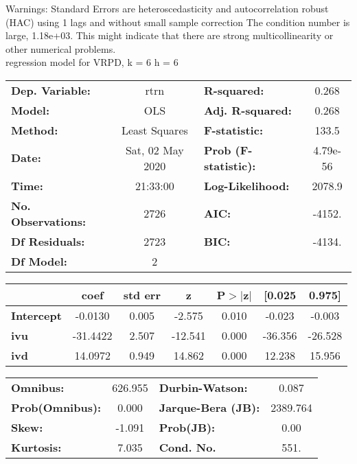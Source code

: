 Warnings: \newline
 [1] Standard Errors are heteroscedasticity and autocorrelation robust (HAC) using 1 lags and without small sample correction \newline
 [2] The condition number is large, 1.18e+03. This might indicate that there are \newline
 strong multicollinearity or other numerical problems.\\ 

regression model for VRPD, k = 6 h = 6\begin{center}
\begin{tabular}{lclc}
\toprule
\textbf{Dep. Variable:}    &       rtrn       & \textbf{  R-squared:         } &     0.268   \\
\textbf{Model:}            &       OLS        & \textbf{  Adj. R-squared:    } &     0.268   \\
\textbf{Method:}           &  Least Squares   & \textbf{  F-statistic:       } &     133.5   \\
\textbf{Date:}             & Sat, 02 May 2020 & \textbf{  Prob (F-statistic):} &  4.79e-56   \\
\textbf{Time:}             &     21:33:00     & \textbf{  Log-Likelihood:    } &    2078.9   \\
\textbf{No. Observations:} &        2726      & \textbf{  AIC:               } &    -4152.   \\
\textbf{Df Residuals:}     &        2723      & \textbf{  BIC:               } &    -4134.   \\
\textbf{Df Model:}         &           2      & \textbf{                     } &             \\
\bottomrule
\end{tabular}
\begin{tabular}{lcccccc}
                   & \textbf{coef} & \textbf{std err} & \textbf{z} & \textbf{P$> |$z$|$} & \textbf{[0.025} & \textbf{0.975]}  \\
\midrule
\textbf{Intercept} &      -0.0130  &        0.005     &    -2.575  &         0.010        &       -0.023    &       -0.003     \\
\textbf{ivu}       &     -31.4422  &        2.507     &   -12.541  &         0.000        &      -36.356    &      -26.528     \\
\textbf{ivd}       &      14.0972  &        0.949     &    14.862  &         0.000        &       12.238    &       15.956     \\
\bottomrule
\end{tabular}
\begin{tabular}{lclc}
\textbf{Omnibus:}       & 626.955 & \textbf{  Durbin-Watson:     } &    0.087  \\
\textbf{Prob(Omnibus):} &   0.000 & \textbf{  Jarque-Bera (JB):  } & 2389.764  \\
\textbf{Skew:}          &  -1.091 & \textbf{  Prob(JB):          } &     0.00  \\
\textbf{Kurtosis:}      &   7.035 & \textbf{  Cond. No.          } &     551.  \\
\bottomrule
\end{tabular}
\end{center}

